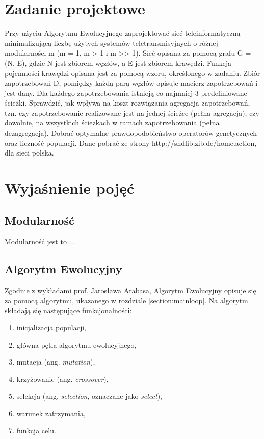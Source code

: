 \section{Zadanie projektowe}

Przy użyciu Algorytmu Ewolucyjnego zaprojektować sieć teleinformatyczną minimalizującą liczbę użytych systemów teletransmisyjnych o różnej modularności m (m = 1, m > 1 i m >> 1). Sieć opisana za pomocą grafu G = (N, E), gdzie N jest zbiorem węzłów, a E jest zbiorem krawędzi. Funkcja pojemności krawędzi opisana jest za pomocą wzoru, określonego w zadaniu. Zbiór zapotrzebowań D, pomiędzy każdą parą węzłów opisuje macierz zapotrzebowań i jest dany. Dla
każdego zapotrzebowania istnieją co najmniej 3 predefiniowane ścieżki. Sprawdzić,
jak wpływa na koszt rozwiązania agregacja zapotrzebowań, tzn. czy zapotrzebowanie realizowane jest na jednej ścieżce (pełna agregacja), czy dowolnie, na
wszystkich ścieżkach w ramach zapotrzebowania (pełna dezagregacja). Dobrać
optymalne prawdopodobieństwo operatorów genetycznych oraz liczność populacji. Dane pobrać ze strony http://sndlib.zib.de/home.action, dla sieci polska.

\section{Wyjaśnienie pojęć}
\label{section:explanation}

\subsection{Modularność}
Modularność jest to ... 

\subsection{Algorytm Ewolucyjny}

Zgodnie z wykładami prof. Jarosława Arabasa, Algorytm Ewolucyjny opisuje się za pomocą algorytmu, ukazanego w rozdziale \ref{section:mainloop}. Na algorytm składają się następujące funkcjonalności:
\begin{enumerate}
    \item inicjalizacja populacji,
    \item główna pętla algorytmu ewolucyjnego,
    \item mutacja (ang. \textit{mutation}),
    \item krzyżowanie (ang. \textit{crossover}),
    \item selekcja (ang. \textit{selection}, oznaczane jako \textit{select}),
    \item warunek zatrzymania,
    \item funkcja celu.
\end{enumerate}

